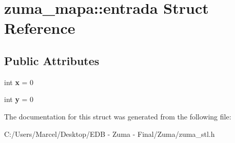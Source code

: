 \hypertarget{structzuma__mapa_1_1entrada}{\section{zuma\-\_\-mapa\-:\-:entrada Struct Reference}
\label{structzuma__mapa_1_1entrada}
}
\subsection*{Public Attributes}
\begin{DoxyCompactItemize}
\item 
\hypertarget{structzuma__mapa_1_1entrada_ac8286687a60ab5d4dab44e61ea39a1e3}{int {\bfseries x} = 0}\label{structzuma__mapa_1_1entrada_ac8286687a60ab5d4dab44e61ea39a1e3}

\item 
\hypertarget{structzuma__mapa_1_1entrada_a8b330350502147699228fc281a3b4a62}{int {\bfseries y} = 0}\label{structzuma__mapa_1_1entrada_a8b330350502147699228fc281a3b4a62}

\end{DoxyCompactItemize}


The documentation for this struct was generated from the following file\-:\begin{DoxyCompactItemize}
\item 
C\-:/\-Users/\-Marcel/\-Desktop/\-E\-D\-B -\/ Zuma -\/ Final/\-Zuma/zuma\-\_\-stl.\-h\end{DoxyCompactItemize}
